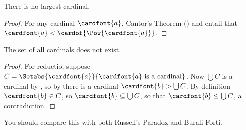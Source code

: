\documentclass[../../../include/open-logic-section]{subfiles}
\begin{document}
\begin{thm}There is no largest cardinal.
\end{thm}
\begin{proof}For any cardinal $\cardfont{a}$, Cantor's Theorem () and  entail that $\cardfont{a} < \cardof{\Pow{\cardfont{a}}}$.
\end{proof}
\begin{thm}The set of all cardinals does not exist.
\end{thm}
\begin{proof}
	For reductio, suppose $C = \Setabs{\cardfont{a}}{\cardfont{a}\text{ is a cardinal}}$. Now $\bigcup C$ is a cardinal by , so by  there is a cardinal $\cardfont{b} > \bigcup C$. By definition $\cardfont{b} \in C$, so $\cardfont{b} \subseteq \bigcup{C}$, so that $\cardfont{b} \leq \bigcup C$, a contradiction.
\end{proof}\noindent
You should compare this with both Russell's Paradox and Burali-Forti. 
\end{document}
